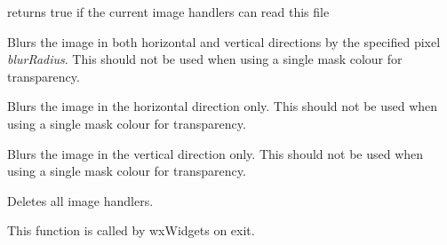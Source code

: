 

returns true if the current image handlers can read this file



\label{wximageblur}


Blurs the image in both horizontal and vertical directions by the specified pixel
{\it blurRadius}. This should not be used when using a single mask colour
for transparency.




\label{wximagehorzblur}


Blurs the image in the horizontal direction only. This should not be used
when using a single mask colour for transparency.



\label{wximagevertblur}


Blurs the image in the vertical direction only. This should not be used
when using a single mask colour for transparency.




\label{wximagecleanuphandlers}


Deletes all image handlers.

This function is called by wxWidgets on exit.


\label{wximagecomputehistogram}


